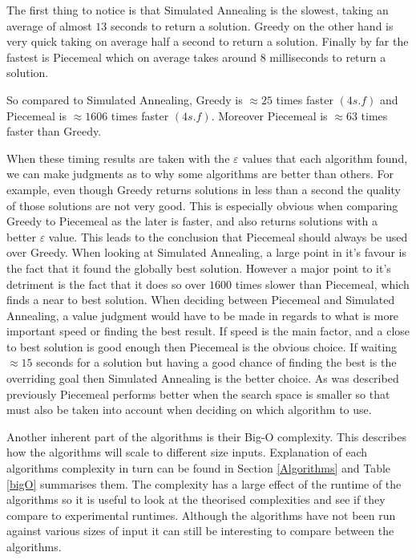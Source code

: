 \documentclass[12pt]{report}
\begin{document}
The first thing to notice is that Simulated Annealing is the slowest, taking an average of almost $13$ seconds to return a solution. Greedy on the other hand is very quick taking on average half a second to return a solution. Finally by far the fastest is Piecemeal which on average takes around $8$ milliseconds to return a solution.

So compared to Simulated Annealing, Greedy is $\approx 25$ times faster $(4 s.f)$ and Piecemeal is $\approx 1606$ times faster $(4 s.f)$. Moreover Piecemeal is $\approx 63$ times faster than Greedy.

When these timing results are taken with the $\varepsilon$ values that each algorithm found, we can make judgments as to why some algorithms are better than others. For example, even though Greedy returns solutions in less than a second the quality of those solutions are not very good. This is especially obvious when comparing Greedy to Piecemeal as the later is faster, and also returns solutions with a better $\varepsilon$ value. This leads to the conclusion that Piecemeal should always be used over Greedy. When looking at Simulated Annealing, a large point in it's favour is the fact that it found the globally best solution. However a major point to it's detriment is the fact that it does so over $1600$ times slower than Piecemeal, which finds a near to best solution. When deciding between Piecemeal and Simulated Annealing, a value judgment would have to be made in regards to what is more important speed or finding the best result. If speed is the main factor, and a close to best solution is good enough then Piecemeal is the obvious choice. If waiting $\approx 15$ seconds for a solution but having a good chance of finding the best is the overriding goal then Simulated Annealing is the better choice. As was described previously Piecemeal performs better when the search space is smaller so that must also be taken into account when deciding on which algorithm to use.

Another inherent part of the algorithms is their Big-O complexity. This describes how the algorithms will scale to different size inputs. Explanation of each algorithms complexity in turn can be found in Section \ref{Algorithms} and Table \ref{bigO} summarises them. The complexity has a large effect of the runtime of the algorithms so it is useful to look at the theorised complexities and see if they compare to experimental runtimes. Although the algorithms have not been run against various sizes of input it can still be interesting to compare between the algorithms.
\end{document}
